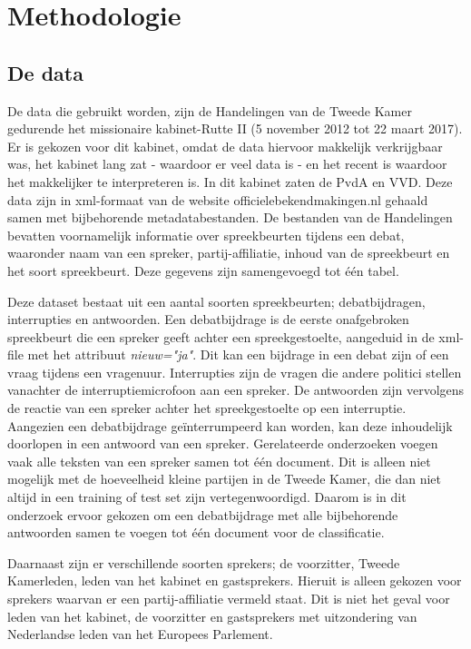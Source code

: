 \section{Methodologie}
\label{sec:meth}


\subsection{De data}
\label{data}
De data die gebruikt worden, zijn de Handelingen van de Tweede Kamer gedurende het missionaire kabinet-Rutte II (5 november 2012 tot 22 maart 2017). Er is gekozen voor dit kabinet, omdat de data hiervoor makkelijk verkrijgbaar was, het kabinet lang zat - waardoor er veel data is - en het recent is waardoor het makkelijker te interpreteren is. In dit kabinet zaten de PvdA en VVD. Deze data zijn in xml-formaat van de website officielebekendmakingen.nl gehaald samen met bijbehorende metadatabestanden. De bestanden van de Handelingen bevatten voornamelijk informatie over spreekbeurten tijdens een debat, waaronder naam van een spreker, partij-affiliatie, inhoud van de spreekbeurt en het soort spreekbeurt. Deze gegevens zijn samengevoegd tot één tabel.\par
Deze dataset bestaat uit een aantal soorten spreekbeurten; debatbijdragen, interrupties en antwoorden. Een debatbijdrage is de eerste onafgebroken spreekbeurt die een spreker geeft achter een spreekgestoelte, aangeduid in de xml-file met het attribuut \textit{nieuw="ja"}. Dit kan een bijdrage in een debat zijn of een vraag tijdens een vragenuur. Interrupties zijn de vragen die andere politici stellen vanachter de interruptiemicrofoon aan een spreker. De antwoorden zijn vervolgens de reactie van een spreker achter het spreekgestoelte op een interruptie. Aangezien een debatbijdrage geïnterrumpeerd kan worden, kan deze inhoudelijk doorlopen in een antwoord van een spreker.  Gerelateerde onderzoeken voegen vaak alle teksten van een spreker samen tot één document. Dit is alleen niet mogelijk met de hoeveelheid kleine partijen in de Tweede Kamer, die dan niet altijd in een training of test set zijn vertegenwoordigd. Daarom is in dit onderzoek ervoor gekozen om een debatbijdrage met alle bijbehorende antwoorden samen te voegen tot één document voor de classificatie.\par
Daarnaast zijn er verschillende soorten sprekers; de voorzitter, Tweede Kamerleden, leden van het kabinet en gastsprekers. Hieruit is alleen gekozen voor sprekers waarvan er een partij-affiliatie vermeld staat. Dit is niet het geval voor leden van het kabinet, de voorzitter en gastsprekers met uitzondering van Nederlandse leden van het Europees Parlement.\par

